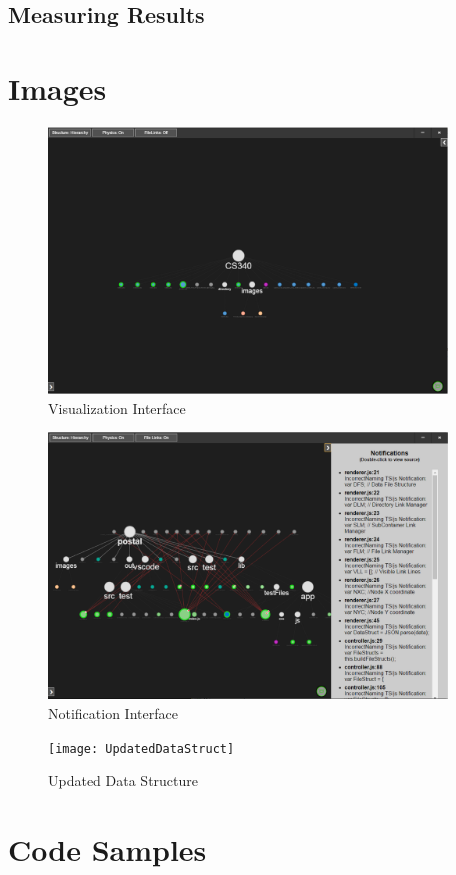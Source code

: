 \documentclass[letterpaper,10pt,titlepage,draftclsnofoot,onecolumn,onesided] {IEEEtran}
\begin{document}
	\subsection{Measuring Results}

\pagebreak	
\section{Images}
	\begin{figure}
		\includegraphics[width=400px]{PostalUI}
		\caption{Visualization Interface}  
	\end{figure}
	
	\begin{figure}
		\includegraphics[width=400px]{PostalNotification}
		\caption{Notification Interface}  
	\end{figure}
	
	\begin{figure}
		\texttt{[image: UpdatedDataStruct]}
		\caption{Updated Data Structure}
	\end{figure}

\pagebreak
\section{Code Samples}
\end{document}
